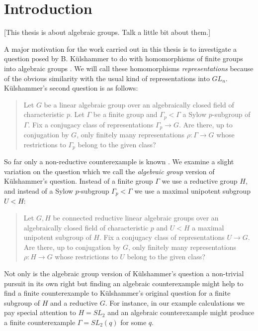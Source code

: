 
\chapter{Introduction}
\label{Chapter1}

[This thesis is about algebraic groups. Talk a little bit about them.]

A major motivation for the work carried out in this thesis is to investigate a question posed by B. K\"ulshammer to do with homomorphisms of finite groups into algebraic groups \cite{weil1964remarks}. We will call these homomorphisms \emph{representations} because of the obvious similarity with the usual kind of representations into $GL_n$. K\"ulshammer's second question is as follows:
\begin{quote}
  Let $G$ be a linear algebraic group over an algebraically closed field of characteristic $p$. Let $\Gamma$ be a finite group and $\Gamma_p < \Gamma$ a Sylow $p$-subgroup of $\Gamma$. Fix a conjugacy class of representations $\Gamma_p\rightarrow G$. Are there, up to conjugation by $G$, only finitely many representations $\rho:\Gamma\rightarrow G$ whose restrictions to $\Gamma_p$ belong to the given class?
\end{quote}

So far only a non-reductive counterexample is known \cite{weil1964remarks}. We examine a slight variation on the question which we call the \emph{algebraic group} version of K\"ulshammer's question. Instead of a finite group $\Gamma$ we use a reductive group $H$, and instead of a Sylow $p$-subgroup $\Gamma_p < \Gamma$ we use a maximal unipotent subgroup $U < H$:
\begin{quote}
  Let $G,H$ be connected reductive linear algebraic groups over an algebraically closed field of characteristic $p$ and $U < H$ a maximal unipotent subgroup of $H$. Fix a conjugacy class of representations $U\rightarrow G$. Are there, up to conjugation by $G$, only finitely many representations $\rho:H\rightarrow G$ whose restrictions to $U$ belong to the given class?
\end{quote}
Not only is the algebraic group version of K\"ulshammer's question a non-trivial pursuit in its own right but finding an algebraic counterexample might help to find a finite counterexample to K\"ulshammer's original question for a finite subgroup of $H$ and a reductive $G$. For instance, in our example calculations we pay special attention to $H = SL_2$ and an algebraic counterexample might produce a finite counterexample $\Gamma = SL_2(q)$ for some $q$.


